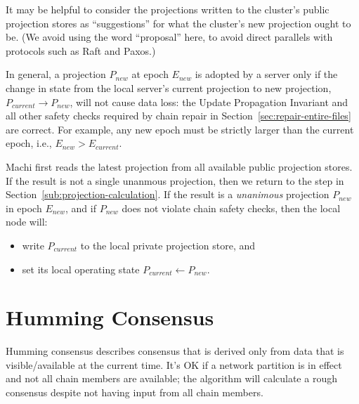 \documentclass[preprint,10pt]{sigplanconf}
\begin{document}
It may be helpful to consider the projections written to the cluster's
public projection stores as ``suggestions'' for what the cluster's new
projection ought to be.  (We avoid using the word ``proposal'' here,
to avoid direct parallels with protocols such as Raft and Paxos.)

In general, a projection $P_{new}$ at epoch $E_{new}$ is adopted by a
server only if
the change in state from the local server's current projection to new
projection, $P_{current} \rightarrow P_{new}$, will not cause data loss:
the Update Propagation Invariant and all other safety checks
required by chain repair in Section~\ref{sec:repair-entire-files}
are correct. For example, any new epoch must be strictly larger than
the current epoch, i.e., $E_{new} > E_{current}$.

Machi first reads the latest projection from all
available public projection stores.  If the result is not a single
unanmous projection, then we return to the step in
Section~\ref{sub:projection-calculation}.  If the result is a {\em
  unanimous} projection $P_{new}$ in epoch $E_{new}$, and if $P_{new}$
does not violate chain safety checks, then the local node will:

\begin{itemize}
\item write $P_{current}$ to the local private projection store, and
\item set its local operating state $P_{current} \leftarrow P_{new}$.
\end{itemize}

\section{Humming Consensus}
\label{sec:humming-consensus}

Humming consensus describes consensus that is derived only from data
that is visible/available at the current time.  It's OK if a network
partition is in effect and not all chain members are available;
the algorithm will calculate a rough consensus despite not
having input from all chain members.
\end{document}
